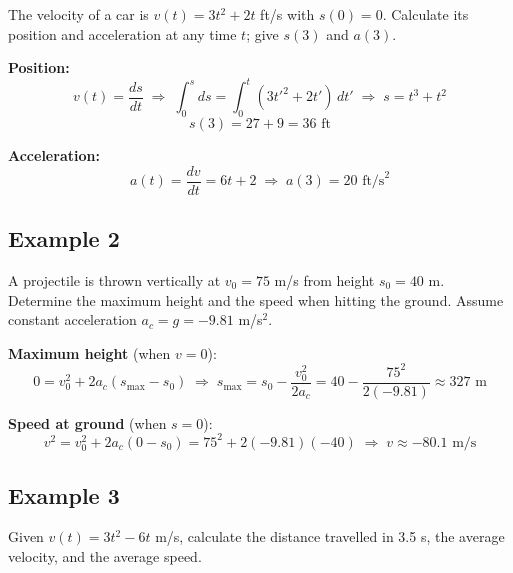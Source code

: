\documentclass{wilson-summary}
\begin{document}
The velocity of a car is $v(t) = 3t^2 + 2t$ ft/s with $s(0)=0$.
Calculate its position and acceleration at any time $t$; give $s(3)$ and $a(3)$.
 
\medskip
\textbf{Position:}
\[
  v(t) = \frac{ds}{dt}
  \;\Rightarrow\;
  \int_0^s ds = \int_0^t (3t'^2 + 2t')\,dt'
  \;\Rightarrow\;
  s = t^3 + t^2
\]
\[
  s(3) = 27 + 9 = \boxed{36\text{ ft}}
\]
 
\textbf{Acceleration:}
\[
  a(t) = \frac{dv}{dt} = 6t + 2
  \;\Rightarrow\;
  a(3) = \boxed{20\text{ ft/s}^2}
\]
 
\subsection*{Example 2}
 
A projectile is thrown vertically at $v_0 = 75$ m/s from height $s_0 = 40$ m.
Determine the maximum height and the speed when hitting the ground.
Assume constant acceleration $a_c = g = -9.81$ m/s$^2$.
 
\begin{center}
\end{center}
 
\textbf{Maximum height} (when $v=0$):
\[
  0 = v_0^2 + 2a_c(s_{\max}-s_0)
  \;\Rightarrow\;
  s_{\max} = s_0 - \frac{v_0^2}{2a_c}
  = 40 - \frac{75^2}{2(-9.81)}
  \approx \boxed{327\text{ m}}
\]
 
\textbf{Speed at ground} (when $s=0$):
\[
  v^2 = v_0^2 + 2a_c(0-s_0)
  = 75^2 + 2(-9.81)(-40)
  \;\Rightarrow\;
  v \approx \boxed{-80.1\text{ m/s}}
\]
 
\subsection*{Example 3}
 
Given $v(t) = 3t^2 - 6t$ m/s, calculate the distance travelled in 3.5 s,
the average velocity, and the average speed.
 
\end{document}
